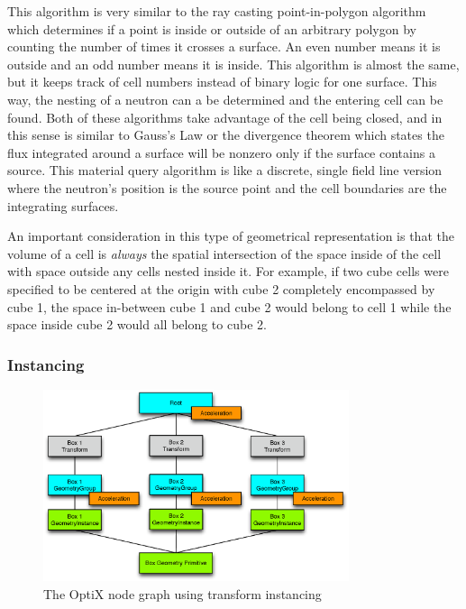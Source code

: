This algorithm is very similar to the ray casting point-in-polygon algorithm which determines if a point is inside or outside of an arbitrary polygon by counting the number of times it crosses a surface.  An even number means it is outside and an odd number means it is inside.  This algorithm is almost the same, but it keeps track of cell numbers instead of binary logic for one surface.  This way, the nesting of a neutron can a be determined and the entering cell can be found.  Both of these algorithms take advantage of the cell being closed, and in this sense is similar to Gauss's Law or the divergence theorem which states the flux integrated around a surface will be nonzero only if the surface contains a source.  This material query algorithm is like a discrete, single field line version where the neutron's position is the source point and the cell boundaries are the integrating surfaces.

An important consideration in this type of geometrical representation is that the volume of a cell is \emph{always} the spatial intersection of the space inside of the cell with space outside any cells nested inside it.  For example, if two cube cells were specified to be centered at the origin with cube 2 completely encompassed by cube 1, the space in-between cube 1 and cube 2 would belong to cell 1 while the space inside cube 2 would all belong to cube 2.

\subsubsection{Instancing}

\begin{figure}[h!] 
  \centering
    \includegraphics[width=0.8\textwidth]{graphics/transform_instancing.eps}
     \caption{The OptiX node graph using transform instancing \label{transform_instancing} }
\end{figure}

